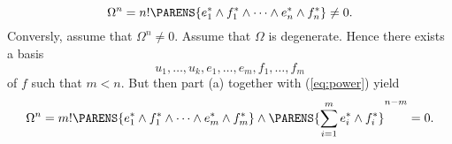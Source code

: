 \begin{solution}
	\begin{equation*}
		\Omega^n = n! \PARENS{e_1^* \wedge f_1^* \wedge \dots \wedge e_n^* \wedge f_n^*} \neq 0.
	\end{equation*}
	Conversly, assume that $\Omega^n \neq 0$. Assume that $\Omega$ is degenerate. Hence there exists a basis
	\begin{equation*}
		u_1,\dots,u_k,e_1,\dots,e_m,f_1,\dots,f_m
	\end{equation*}
	\noindent of $f$ such that $m < n$. But then part (a) together with (\ref{eq:power}) yield
	\begin{equation*}
		\Omega^n = m! \PARENS{e_1^* \wedge f_1^* \wedge \dots \wedge e_m^* \wedge f_m^*} \wedge \PARENS{\sum_{i = 1}^m e_i^* \wedge f_i^*}^{n - m} = 0.
	\end{equation*}
\end{solution}

